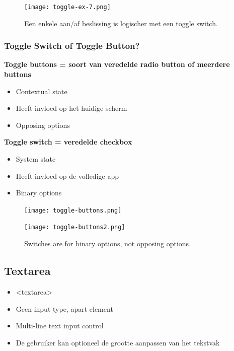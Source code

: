 \documentclass{article}
\newcommand{\bold}[1]{\textbf{#1}}
\begin{document}
\begin{figure}[H]
    \centering
    \texttt{[image: toggle-ex-7.png]}
    \caption{Een enkele aan/af beslissing is logischer met een toggle switch.}
\end{figure}

\subsubsection{Toggle Switch of Toggle Button?}

\bold{Toggle buttons = soort van veredelde radio button of meerdere buttons}

\begin{itemize}
    \item Contextual state
    \item Heeft invloed op het huidige scherm
    \item Opposing options
\end{itemize}


\bold{Toggle switch = veredelde checkbox}
\begin{itemize}
    \item System state
    \item Heeft invloed op de volledige app
    \item Binary options
\end{itemize}

\begin{figure}[H]
    \centering
    \texttt{[image: toggle-buttons.png]}
    \caption{}
\end{figure}

\begin{figure}[H]
    \centering
    \texttt{[image: toggle-buttons2.png]}
    \caption{Switches are for binary options, not opposing options.}
\end{figure}

\subsection{Textarea}
\begin{itemize}
    \item <textarea>
    \item Geen input type, apart element
    \item Multi-line text input control
    \item De gebruiker kan optioneel de grootte aanpassen van het tekstvak
\end{itemize}
\end{document}
